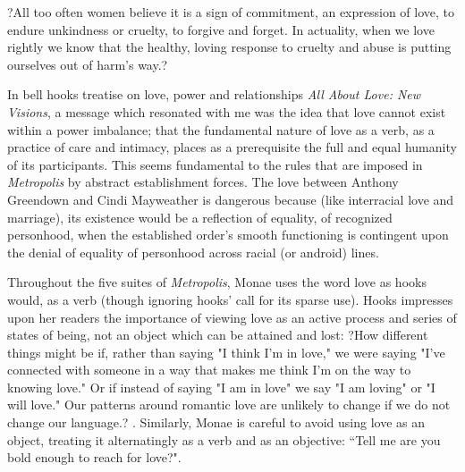 \documentclass[a4paper, 11pt]{article} %
\begin{document}
?All too often women believe it is a sign of commitment, an expression of love, to endure unkindness or cruelty, to forgive and forget. In actuality, when we love rightly we know that the healthy, loving response to cruelty and abuse is putting ourselves out of harm's way.?\cite{newvisions}

In bell hooks treatise on love, power and relationships \emph{All About Love: New Visions}, a message which resonated with me was the idea that love cannot exist within a power imbalance; that the fundamental nature of love as a verb, as a practice of care and intimacy, places as a prerequisite the full and equal humanity of its participants\cite{newvisions}. 
This seems fundamental to the rules that are imposed in \emph{Metropolis} by abstract establishment forces. 
The love between Anthony Greendown and Cindi Mayweather is dangerous because (like interracial love and marriage), its existence would be a reflection of equality, of recognized personhood, when the established order's smooth functioning is contingent upon the denial of equality of personhood across racial (or android) lines. 

Throughout the five suites of \emph{Metropolis}, Monae uses the word love as hooks would, as a verb (though ignoring hooks' call for its sparse use).
Hooks impresses upon her readers the importance of viewing love as an active process and series of states of being, not an object which can be attained and lost:
?How different things might be if, rather than saying "I think I'm in love," we were saying "I've connected with someone in a way that makes me think I'm on the way to knowing love." Or if instead of saying "I am in love" we say "I am loving" or "I will love." Our patterns around romantic love are unlikely to change if we do not change our language.? \cite{newvisions}.
Similarly, Monae is careful to avoid using love as an object, treating it alternatingly as a verb and as an objective: ``Tell me are you bold enough to reach for love?"\cite{manymoons}.



\nocite{*}
{}


\end{document}

